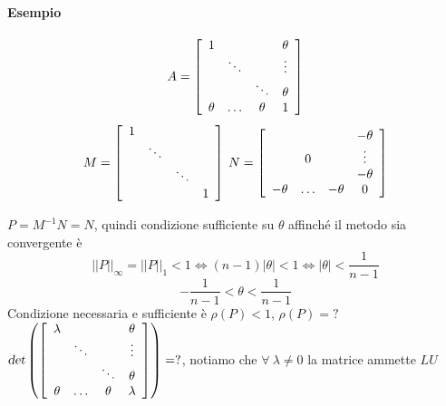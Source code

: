 \documentclass[10pt]{book}
\begin{document}
\paragraph{Esempio}
\begin{multicols}{2}
$$A = \left[\begin{array}{c c c c}
1 & & & \theta\\
& \ddots & & \vdots\\
& & \ddots & \theta\\
\theta & \ldots & \theta & 1
\end{array} \right]$$
$$M = \left[\begin{array}{c c c c}
1 & & & \\
& \ddots & & \\
& & \ddots & \\
 &  &  & 1
\end{array} \right]\: N = \left[\begin{array}{c c c c}
 & & & -\theta\\
& 0 & & \vdots\\
& &  & -\theta\\
-\theta & \ldots & -\theta & 0
\end{array} \right]$$
\end{multicols}
$P = M^{-1}N = N$, quindi condizione sufficiente su $\theta$ affinché il metodo sia convergente è $$||P||_\infty = ||P||_1 < 1 \Leftrightarrow (n-1)|\theta| < 1 \Leftrightarrow |\theta| < \frac{1}{n-1}$$
$$-\frac{1}{n-1} < \theta < \frac{1}{n-1}$$
Condizione necessaria e sufficiente è $\rho(P) < 1$, $\rho(P) = ?$\\
$\textsl{det}\left(\left[ \begin{array}{c c c c}
\lambda & & & \theta\\
& \ddots & & \vdots\\
& & \ddots & \theta\\
\theta & \ldots & \theta & \lambda
\end{array}\right]\right) = ?$, notiamo che $\forall\:\lambda\neq 0$ la matrice ammette $LU$
\end{document}
